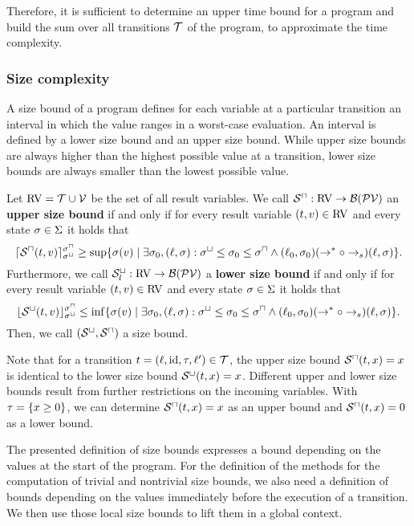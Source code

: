 

Therefore, it is sufficient to determine an upper time bound for a program and build the sum over all transitions $\mathcal{T}$ of the program, to approximate the time complexity. 

\subsubsection{Size complexity}

A size bound of a program defines for each variable at a particular transition an interval in which the value ranges in a worst-case evaluation.
An interval is defined by a lower size bound and an upper size bound.
While upper size bounds are always higher than the highest possible value at a transition, lower size bounds are always smaller than the lowest possible value.

\begin{definition}
  Let $\text{RV} = \mathcal{T} \cup \mathcal{V}$ be the set of all result variables.
  We call ${\mathcal{S}^\sqcap}: \text{RV} \rightarrow \mathcal{B}(\mathcal{PV})$ an \textbf{upper size bound} if and only if for every result variable $(t, v) \in \text{RV}$ and every state $\sigma \in \Sigma$ it holds that
  \[ \lceil {\mathcal{S}^\sqcap}(t, v) \rceil^{{\sigma^\sqcap}}_{{\sigma^\sqcup}} \geq \sup \lbrace  \sigma(v) \mid \exists \sigma_0, (\ell, \sigma): {\sigma^\sqcup} \leq \sigma_0 \leq {\sigma^\sqcap} \wedge (\ell_0, \sigma_0) (\rightarrow^* \circ \rightarrow_s) (\ell, \sigma) \rbrace. \]
  Furthermore, we call ${\mathcal{S}^\sqcup_l}: \text{RV} \rightarrow \mathcal{B}(\mathcal{PV})$ a \textbf{lower size bound} if and only if for every result variable $(t, v) \in \text{RV}$ and every state $\sigma \in \Sigma$ it holds that
  \[ \lfloor {\mathcal{S}^\sqcup}(t, v) \rfloor^{{\sigma^\sqcap}}_{{\sigma^\sqcup}} \leq \inf \lbrace  \sigma(v) \mid \exists \sigma_0, (\ell, \sigma): {\sigma^\sqcup} \leq \sigma_0 \leq {\sigma^\sqcap} \wedge (\ell_0, \sigma_0) (\rightarrow^* \circ \rightarrow_s) (\ell, \sigma) \rbrace. \]
  Then, we call ${({\mathcal{S}^\sqcup}, {\mathcal{S}^\sqcap})}$ a size bound.
\end{definition}

Note that for a transition $t = (\ell,\text{id},\tau,\ell') \in \mathcal{T}$, the upper size bound ${\mathcal{S}^\sqcap}(t,x) = x$ is identical to the lower size bound ${\mathcal{S}^\sqcup}(t,x) = x$.
Different upper and lower size bounds result from further restrictions on the incoming variables.
With $\tau = \lbrace x \geq 0 \rbrace$, we can determine ${\mathcal{S}^\sqcap}(t,x) = x$ as an upper bound and ${\mathcal{S}^\sqcap}(t,x) = 0$ as a lower bound.

The presented definition of size bounds expresses a bound depending on the values at the start of the program.
For the definition of the methods for the computation of trivial and nontrivial size bounds, we also need a definition of bounds depending on the values immediately before the execution of a transition.
We then use those local size bounds to lift them in a global context.

